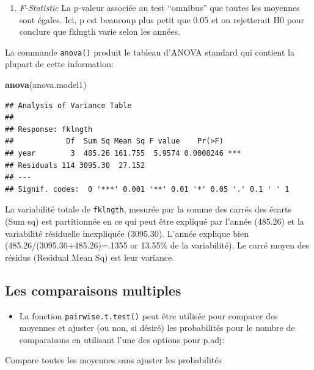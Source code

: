 \documentclass[12pt,]{book}
\newenvironment{Shaded}{\begin{snugshade}}{\end{snugshade}}
\newcommand{\KeywordTok}[1]{\textcolor[rgb]{0.13,0.29,0.53}{\textbf{#1}}}
\newcommand{\NormalTok}[1]{#1}
\providecommand{\tightlist}{%
  \setlength{\itemsep}{0pt}\setlength{\parskip}{0pt}}
\begin{document}
\begin{enumerate}
\def\labelenumi{\arabic{enumi}.}
\setcounter{enumi}{3}
\tightlist
\item
  \emph{F-Statistic} La p-valeur associée au test ``omnibus'' que toutes les moyennes sont égales. Ici, p est beaucoup plus petit que 0.05 et on rejetterait H0 pour conclure que fklngth varie selon les années.
\end{enumerate}

La commande \texttt{anova()} produit le tableau d'ANOVA standard qui contient la plupart de cette information:

\begin{Shaded}
\begin{Highlighting}[]
\KeywordTok{anova}\NormalTok{(anova.model1)}
\end{Highlighting}
\end{Shaded}

\begin{verbatim}
## Analysis of Variance Table
## 
## Response: fklngth
##            Df  Sum Sq Mean Sq F value    Pr(>F)    
## year        3  485.26 161.755  5.9574 0.0008246 ***
## Residuals 114 3095.30  27.152                      
## ---
## Signif. codes:  0 '***' 0.001 '**' 0.01 '*' 0.05 '.' 0.1 ' ' 1
\end{verbatim}

La variabilité totale de \texttt{fklngth}, mesurée par la somme des carrés des écarts (Sum sq) est partitionnée en ce qui peut être expliqué par l'année (485.26) et la variabilité résiduelle inexpliquée (3095.30). L'année explique bien (485.26/(3095.30+485.26)=.1355 or 13.55\% de la variabilité). Le carré moyen des résidus (Residual Mean Sq) est leur variance.

\hypertarget{les-comparaisons-multiples}{%
\subsection{Les comparaisons multiples}\label{les-comparaisons-multiples}}

\begin{itemize}
\tightlist
\item
  La fonction \texttt{pairwise.t.test()} peut être utilisée pour comparer des moyennes et ajuster (ou non, si désiré) les probabilités pour le nombre de comparaisons en utilisant l'une des options pour p.adj:
\end{itemize}

Compare toutes les moyennes sans ajuster les probabilités
\end{document}
